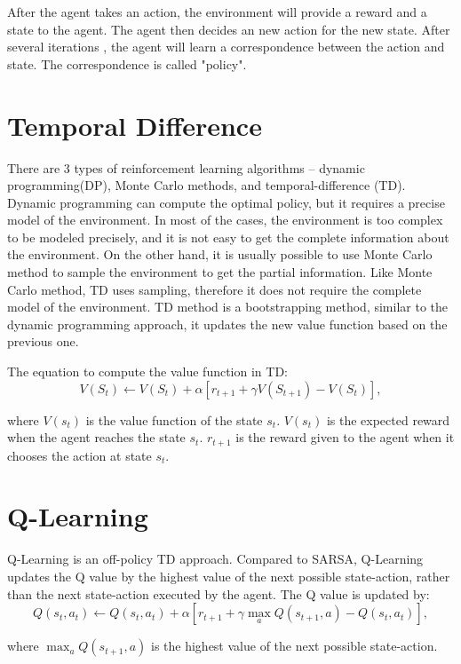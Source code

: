 After the agent takes an action, the environment will provide a reward and a state to the
agent. The agent then decides an new action for the new state. After several iterations
, the agent will learn a correspondence between the action and state. The correspondence is called 
"policy". 

\section{Temporal Difference}
\label{sec:TD}
There are 3 types of reinforcement learning algorithms -- dynamic programming(DP), Monte Carlo 
methods, and temporal-difference (TD). Dynamic programming can compute the optimal policy, but it 
requires a precise model of the environment. In most of the cases, the environment
is too complex to be modeled precisely, and it is not easy to get the complete information about
the environment. On the other hand, it is usually possible to use Monte Carlo method to sample the environment to
get the partial information. 
Like Monte Carlo method, TD uses sampling, therefore it does not require the 
complete model of the environment. TD method is a bootstrapping method, similar to the dynamic 
programming approach, it updates the new value function based on the previous one.

The equation to compute the value function in TD:
\begin{displaymath}
   V(S_t) \leftarrow V(S_t) + \alpha [r_{t+1} + \gamma V(S_{t+1}) - V(S_t)],
\end{displaymath}

where $V(s_t)$ is the value function of the state $s_t$. $V(s_t)$ is the expected reward when
the agent reaches the state $s_t$. $r_{t+1}$ is the reward given to the agent when it chooses
the action at state $s_t$.

\section{Q-Learning}
\label{sec:Q-Learning}
    Q-Learning is an off-policy TD approach. Compared to SARSA, Q-Learning updates
the Q value by the highest value of the next possible state-action, rather than the 
next state-action executed by the agent.  
The Q value is updated by:
\begin{displaymath}
   Q(s_t, a_t) \leftarrow Q(s_t, a_t) + \alpha [r_{t+1}+\gamma \max_a Q(s_{t+1},a)-Q(s_t,a_t)],
\end{displaymath}

where $\max_a Q(s_{t+1},a)$ is the highest value of the next possible state-action. 

